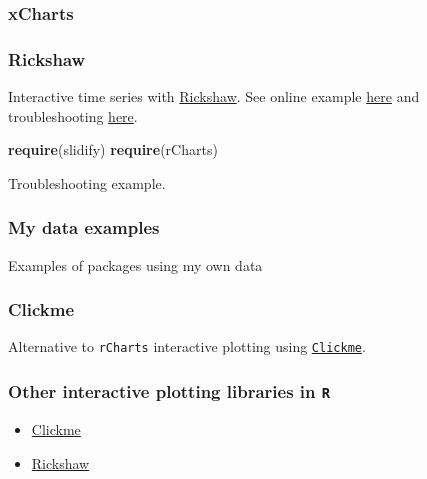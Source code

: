 \documentclass[10,portrait]{article}
\newenvironment{Shaded}{\begin{snugshade}}{\end{snugshade}}
\newcommand{\KeywordTok}[1]{\textcolor[rgb]{0.13,0.29,0.53}{\textbf{#1}}}
\newcommand{\NormalTok}[1]{#1}
\providecommand{\tightlist}{%
  \setlength{\itemsep}{0pt}\setlength{\parskip}{0pt}}
\begin{document}
\subsubsection{xCharts}\label{xcharts}

\subsubsection{Rickshaw}\label{rickshaw}

Interactive time series with
\href{http://rpubs.com/Koba/80208}{Rickshaw}. See online example
\href{http://timelyportfolio.github.io/rCharts_rickshaw_gettingstarted/}{here}
and troubleshooting \href{http://rpubs.com/Koba/80208}{here}.

\begin{Shaded}
\begin{Highlighting}[]
\KeywordTok{require}\NormalTok{(slidify)}
\KeywordTok{require}\NormalTok{(rCharts)}
\end{Highlighting}
\end{Shaded}

Troubleshooting example.

\subsubsection{My data examples}\label{my-data-examples}

Examples of packages using my own data

\subsubsection{Clickme}\label{clickme}

Alternative to \texttt{rCharts} interactive plotting using
\href{https://github.com/nachocab/clickme}{\texttt{Clickme}}.

\subsubsection{\texorpdfstring{Other interactive plotting libraries in
\texttt{R}}{Other interactive plotting libraries in R}}\label{other-interactive-plotting-libraries-in-r}

\begin{itemize}
\tightlist
\item
  \href{https://github.com/nachocab/clickme}{Clickme}\\
\item
  \href{http://rpubs.com/Koba/80208}{Rickshaw}
\end{itemize}
\end{document}
